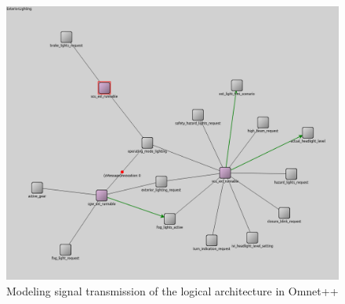 \begin{figure}[htb]
    \centering
    \includegraphics[width=\textwidth]{images/logical_sim.png}
    \caption{Modeling signal transmission of the logical architecture in Omnet++}
    \label{fig:logical_sim}
\end{figure}